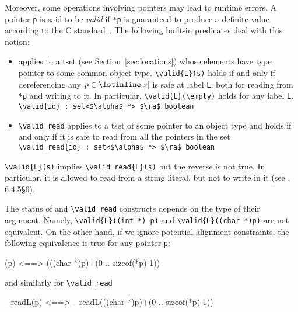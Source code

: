 Moreover, some operations involving pointers may lead to runtime errors.
A pointer \lstinline|p| is said to be \emph{valid} if \lstinline|*p| is guaranteed to
produce a definite value according to the C standard~\cite{standardc99}. The
following built-in predicates deal with this notion:
\begin{itemize}
\item \valid{} applies to a tset
(see Section~\ref{sec:locations}) whose elements have type pointer
to some common object type.
\lstinline|\valid{L}(s)| holds if and only if
 dereferencing any $p\in \lstinline|s|$ is safe  at label \lstinline|L|, both for reading from
\lstinline|*p| and writing to it. In particular,
\lstinline|\valid{L}(\empty)| holds for any label \lstinline|L|.
\\ \makebox[5mm]{} \lstinline|\valid{id} : set<$\alpha$ *> $\ra$ boolean|
\item
\lstinline|\valid_read|
applies to a tset of some pointer to an object type
and holds if and only if it is safe to read from all the pointers in the set
\\ \makebox[5mm]{} \lstinline|\valid_read{id} : set<$\alpha$ *> $\ra$ boolean|
\end{itemize}

\lstinline|\valid{L}(s)| implies \lstinline|\valid_read{L}(s)| but the reverse is
not true. In particular, it is allowed to read from a string literal, but not
to write in it (see \cite{standardc99}, 6.4.5\S6).

The status of \valid and \lstinline|\valid_read| constructs depends on the
type of their argument. Namely, \lstinline|\valid{L}((int *) p)| and
\lstinline|\valid{L}((char *)p)| are not equivalent. On the other hand, if we
ignore potential alignment constraints, the following equivalence is true for any pointer \lstinline|p|:
\begin{listing-nonumber}
(p) <==> (((char *)p)+(0 .. sizeof(*p)-1))
\end{listing-nonumber}
and similarly for \lstinline|\valid_read|
\begin{listing-nonumber}
\valid_read{L}(p) <==> \valid_read{L}(((char *)p)+(0 .. sizeof(*p)-1))
\end{listing-nonumber}

